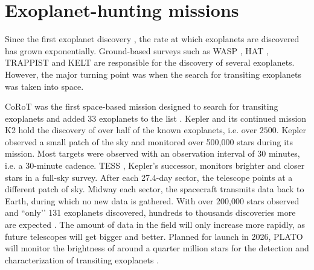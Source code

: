 
\section{Exoplanet-hunting missions}
\label{sec:missions}

Since the first exoplanet discovery \citep{wolszczan1992planetary}, the rate at which exoplanets are discovered has grown exponentially. Ground-based surveys such as WASP \citep{pollacco2006wasp}, HAT \citep{bakos2004wide}, TRAPPIST \citep{jehin2011trappist} and KELT \citep{pepper2007kilodegree} are responsible for the discovery of several exoplanets. However, the major turning point was when the search for transiting exoplanets was taken into space.

CoRoT was the first space-based mission designed to search for transiting exoplanets and added 33 exoplanets to the list \citep{auvergne2009corot}. Kepler \citep{koch2010kepler} and its continued mission K2 \citep{howell2014k2} hold the discovery of over half of the known exoplanets, i.e. over $2500$.
Kepler observed a small patch of the sky and monitored over 500,000 stars during its mission. Most targets were observed with an observation interval of 30 minutes, i.e. a 30-minute cadence. TESS \citep{ricker2014transiting}, Kepler’s successor, monitors brighter and closer stars in a full-sky survey. After each 27.4-day sector, the telescope points at a different patch of sky. Midway each sector, the spacecraft transmits data back to Earth, during which no new data is gathered. With over 200,000 stars observed and ``only’’ 131 exoplanets discovered, hundreds to thousands discoveries more are expected \citep{sullivan2015transiting}. The amount of data in the field will only increase more rapidly, as future telescopes will get bigger and better.
Planned for launch in 2026, PLATO will monitor the brightness of around a quarter million stars for the detection and characterization of transiting exoplanets \citep{rauer2021plato}.

